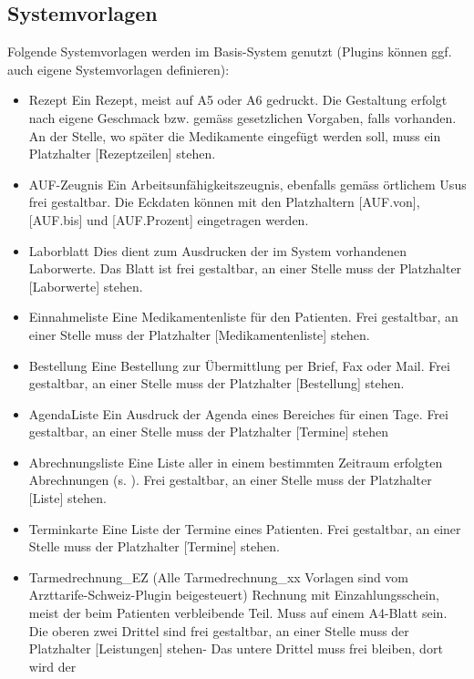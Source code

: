 \subsection{Systemvorlagen}
\label{systemvorlagen}
Folgende Systemvorlagen werden im Basis-System genutzt (Plugins können ggf. auch
eigene Systemvorlagen definieren):
\begin{itemize}

  \item {Rezept} Ein Rezept, meist auf A5 oder A6 gedruckt. Die Gestaltung
  erfolgt nach eigene Geschmack bzw. gemäss gesetzlichen Vorgaben, falls
  vorhanden. An der Stelle, wo später die Medikamente eingefügt werden soll,
  muss ein Platzhalter [Rezeptzeilen] stehen.
  \item {AUF-Zeugnis} Ein Arbeitsunfähigkeitszeugnis, ebenfalls gemäss örtlichem
  Usus frei gestaltbar. Die Eckdaten können mit den Platzhaltern [AUF.von],
  [AUF.bis] und [AUF.Prozent] eingetragen werden.
  \item {Laborblatt} Dies dient zum Ausdrucken der im System vorhandenen
  Laborwerte. Das Blatt ist frei gestaltbar, an einer Stelle muss der
  Platzhalter [Laborwerte] stehen.
  \item {Einnahmeliste} Eine Medikamentenliste für den Patienten. Frei
  gestaltbar, an einer Stelle muss der Platzhalter [Medikamentenliste] stehen.
  \item {Bestellung} Eine Bestellung zur Übermittlung per Brief, Fax oder Mail.
  Frei gestaltbar, an einer Stelle muss der Platzhalter [Bestellung] stehen.
  \item {AgendaListe} Ein Ausdruck der Agenda eines Bereiches für einen Tage.
  Frei gestaltbar, an einer Stelle muss der Platzhalter [Termine] stehen
  \item {Abrechnungsliste} Eine Liste aller in einem bestimmten Zeitraum
  erfolgten Abrechnungen (s. \pageref{fig:konnd}). Frei gestaltbar, an einer
  Stelle muss der Platzhalter [Liste] stehen.
  \item {Terminkarte} Eine Liste der Termine eines Patienten. Frei gestaltbar,
  an einer Stelle muss der Platzhalter [Termine] stehen.
  \item {Tarmedrechnung\_EZ} (Alle Tarmedrechnung\_xx Vorlagen sind vom
  Arzttarife-Schweiz-Plugin beigesteuert) Rechnung mit Einzahlungsschein, meist
  der beim Patienten verbleibende Teil. Muss auf einem A4-Blatt sein. Die oberen
  zwei Drittel sind frei gestaltbar, an einer Stelle muss der Platzhalter
  [Leistungen] stehen- Das untere Drittel muss frei bleiben, dort wird der

\end{itemize}
